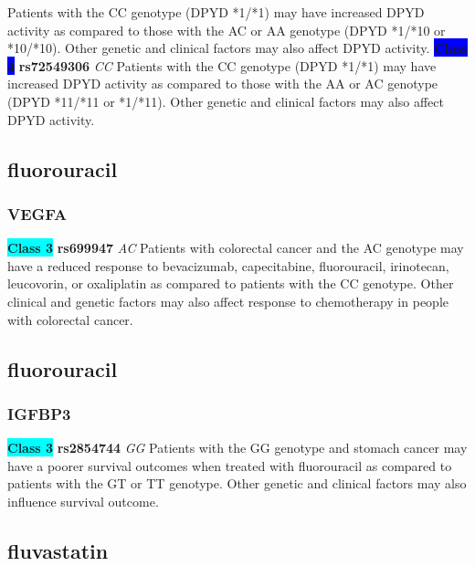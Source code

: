 \documentclass{book}
\begin{document}
\begin{center}
Patients with the CC genotype (DPYD *1/*1) may have increased DPYD activity as compared to those with the AC or AA genotype (DPYD *1/*10 or *10/*10). Other genetic and clinical factors may also affect DPYD activity. \textbf{\colorbox{blue} {Class 4}} \textbf{ rs72549306 } \textit{ CC }
Patients with the CC genotype (DPYD *1/*1) may have increased DPYD activity as compared to those with the AA or AC genotype (DPYD *11/*11 or *1/*11). Other genetic and clinical factors may also affect DPYD activity.

\end{center}\subsection{ fluorouracil }


\subsubsection{ VEGFA }

\begin{center}
\textbf{\colorbox{cyan} {Class 3}} \textbf{ rs699947 } \textit{ AC }
Patients with colorectal cancer and the AC genotype may have a reduced response to bevacizumab, capecitabine, fluorouracil, irinotecan, leucovorin, or oxaliplatin as compared to patients with the CC genotype. Other clinical and genetic factors may also affect response to chemotherapy in people with colorectal cancer.


\end{center}\subsection{ fluorouracil }


\subsubsection{ IGFBP3 }

\begin{center}
\textbf{\colorbox{cyan} {Class 3}} \textbf{ rs2854744 } \textit{ GG }
Patients with the GG genotype and stomach cancer may have a poorer survival outcomes when treated with fluorouracil as compared to patients with the GT or TT genotype. Other genetic and clinical factors may also influence survival outcome.


\end{center}\subsection{ fluvastatin }
\end{document}
